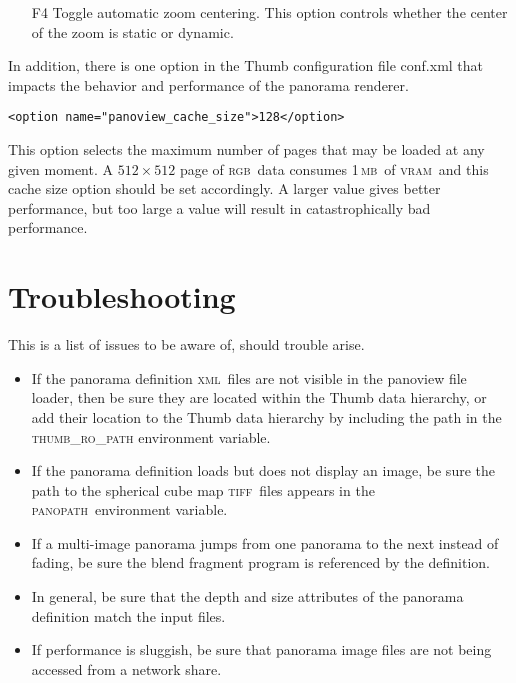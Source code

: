 \documentclass[oneside,11pt]{memoir}
\newcommand{\tiff}    {\textsc{tiff}}
\newcommand{\xml}     {\textsc{xml}}
\newcommand{\panopath}{\textsc{panopath}}
\newcommand{\rgb}     {\textsc{rgb}}
\newcommand{\mb}    {\,\textsc{mb}}
\newcommand{\vram}    {\textsc{vram}}
\begin{document}
\begin{Spacing}{1.1}
\begin{itemize}
\item[F4] Toggle automatic zoom centering. This option controls whether the center of the zoom is static or dynamic.
\end{itemize}

In addition, there is one option in the Thumb configuration file conf.xml that impacts the behavior and performance of the panorama renderer.

\begin{verbatim}
<option name="panoview_cache_size">128</option>
\end{verbatim}

This option selects the maximum number of pages that may be loaded at any given moment. A $512\times 512$ page of \rgb\ data consumes 1\mb\ of \vram\, and this cache size option should be set accordingly. A larger value gives better performance, but too large a value will result in catastrophically bad performance.

\section{Troubleshooting}

This is a list of issues to be aware of, should trouble arise.

\begin{itemize}
\item If the panorama definition \xml\ files are not visible in the panoview file loader, then be sure they are located within the Thumb data hierarchy, or add their location to the Thumb data hierarchy by including the path in the \textsc{thumb\_ro\_path} environment variable.

\item If the panorama definition loads but does not display an image, be sure the path to the spherical cube map \tiff\ files appears in the \panopath\ environment variable.

\item If a multi-image panorama jumps from one panorama to the next instead of fading, be sure the blend fragment program is referenced by the definition.

\item In general, be sure that the depth and size attributes of the panorama definition match the input files.

\item If performance is sluggish, be sure that panorama image files are not being accessed from a network share.
\end{itemize}

\end{Spacing}
\end{document}
